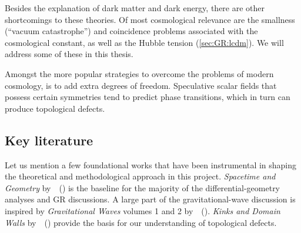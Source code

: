 Besides the explanation of dark matter and dark energy, there are other shortcomings to these theories. %
Of most cosmological relevance are the smallness (``vacuum catastrophe'') and coincidence problems associated with the cosmological constant, as well as the Hubble tension (\cref{sec:GR:lcdm}). We will address some of these in this thesis. 


 
Amongst the more popular strategies to overcome the problems of modern cosmology, is to add extra degrees of freedom. Speculative scalar fields that possess certain symmetries tend to predict phase transitions, which in turn can produce topological defects. 




%







\subsection{Key literature}
    Let us mention a few foundational works that have been instrumental in shaping the theoretical and methodological approach in this project. %
    \textit{Spacetime and Geometry} by~\citeauthor{carrollSpacetimeGeometryIntroduction2019}~(\citeyear{carrollSpacetimeGeometryIntroduction2019}) is the baseline for the majority of the differential-geometry analyses and GR discussions. A large part of the gravitational-wave discussion is inspired by \textit{Gravitational Waves} volumes 1 and 2 by~\citeauthor{maggioreGravitationalWavesVol2007}~(\citeyear{maggioreGravitationalWavesVol2007,maggioreGravitationalWavesVol2018}). \textit{Kinks and Domain Walls} by~\citeauthor{vachaspatiKinksDomainWalls2006}~(\citeyear{vachaspatiKinksDomainWalls2006}) provide the basis for our understanding of topological defects.






